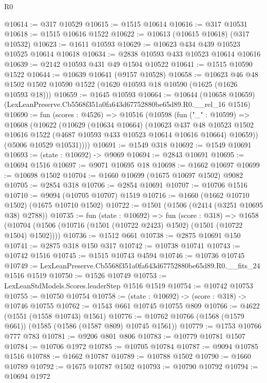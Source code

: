 \begin{lexlean}{R0}
\begin{coremodule}
@10614 := @317 @10529
@10615 := @1515 @10614
@10616 := @317 @10531
@10618 := @1515 @10616 @1522
@10622 := @10613 (@10615 @10618) (@317 @10532)
@10623 := @1611 @10593
@10629 := @10623 @434 @439 @10523 @10525 @10614 @10618
@10634 := @2838 @10593 @433 @10523 @10614 @10616
@10639 := @2142 @10593 @431 @49 @1504 @10522
@10641 := @1515 @10590 @1522
@10644 := @10639 @10641 (@9157 @10528)
@10658 := @10623
    @46
    @48
    @1502
    @1502
    @10590
    @1522
    (@1620 @10593 @18 @10590 (@1625 (@1626 @10593 @18)))
@10659 := @1645 @10593
@10664 := @10644
    (@10658 @10659)
    (LexLeanPreserve.Cb5568f351a0fa643d67752880be65d89.R0.__rel_16 @1516)
@10690 := fun (scores : @4526) =>
  @10516
    (@10598
      (fun ("_" : @10599) =>
      @10608
        (@10622
          (@10629
            (@10634 @10664)
            (@10623
              @437
              @48
              @10523
              @1502
              @10616
              @1522
              (@4687 @10593 @433 @10523 @10614 @10616 @10664)
              @10659))
          (@5006 @10529 @10531))))
@10691 := @1549 @318
@10692 := @1549 @10691
@10693 := (state : @10692) -> @9069
@10694 := @2843 @10691
@10695 := @10694 @1516
@10697 := @9071 @10695 @18
@10698 := @1662 @10697
@10699 := @10698 @1502
@10704 := @1660 @10699 (@1675 @10697 @1502) @9082
@10705 := @2854 @318
@10706 := @2854 @10691
@10707 := @10706 @1516
@10710 := @9094 (@10705 @10707) @1519
@10716 := @1660 (@1662 @10710 @1502) (@1675 @10710 @1502)
@10722 := @1501 (@1506 (@2414 (@3251 @10695 @38) @2788))
@10735 := fun (state : @10692) =>
  fun (score : @318) =>
  @1658 (@10704 (@1506 (@10716 (@1501 (@10722 @2423) @1502) (@1501 (@10722 @1504) @1502))))
@10736 := @1512 @661
@10738 := @2875 @10691 @150
@10741 := @2875 @318 @150 @317
@10742 := @10738 @10741
@10743 := @10742 @1516
@10745 := @1515 @10743 @4594
@10746 := @10736 @10745
@10749 := LexLeanPreserve.Cb5568f351a0fa643d67752880be65d89.R0.__fits_24 @1516 @1519
@10750 := @1526 @10749
@10753 := LexLeanStdModels.Scores.leaderStep @1516 @1519
@10754 := @10742 @10753
@10755 := @10750 @10754
@10758 := (state : @10692) -> (score : @318) -> @10746 @10755
@10762 := @1543 @661 @10745 @10755 @809
@10766 := @4622 (@1551 (@1558 @10743) @1561)
@10776 := @10762 @10766 (@1568 (@1579 @661)) (@1585 (@1586 (@1587 @809) @10745 @1561))
@10779 := @1753 @10766 @777 @783
@10781 := @9206 @801 @806
@10783 := @10779 @10781 @1507
@10784 := @10706 @1972
@10785 := @10705 @10784
@10787 := @9094 @10785 @1516
@10788 := @1662 @10787
@10789 := @10788 @1502
@10790 := @1660 @10789
@10792 := @1675 @10787 @1502
@10793 := @10790 @10792
@10794 := @10694 @1972

\end{coremodule}
\end{lexlean}
